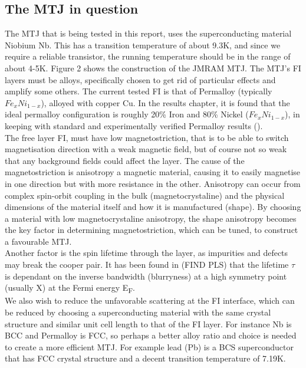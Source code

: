 \documentclass[12pt]{article}
\begin{document}
\subsection{The MTJ in question}


The MTJ that is being tested in this report, uses the superconducting material Niobium Nb. This has a transition temperature of about 9.3K, and since we require a reliable transistor, the running temperature should be in the range of about 4-5K. Figure 2 shows the construction of the JMRAM MTJ. The MTJ's FI layers must be alloys, specifically chosen to get rid of particular effects and amplify some others. The current tested FI is that of Permalloy (typically $Fe_{x}Ni_{1-x}$), alloyed with copper Cu. In the results chapter, it is found that the ideal permalloy configuration is roughly 20\% Iron and 80\% Nickel ($Fe_{x}Ni_{1-x}$), in keeping with standard and experimentally verified Permalloy results (\cite{permprob}).
\\
The free layer FI, must have low magnetostriction, that is to be able to switch magnetisation direction with a weak magnetic field, but of course not so weak that any background fields could affect the layer. The cause of the magnetostriction is anisotropy a magnetic material, causing it to easily magnetise in one direction but with more resistance in the other. Anisotropy can occur from complex spin-orbit coupling in the bulk (magnetocrystaline) and the physical dimensions of the material itself and how it is manufactured (shape). By choosing a material with low magnetocrystaline anisotropy, the shape anisotropy becomes the key factor in determining magnetostriction, which can be tuned, to construct a favourable MTJ. 
\\
Another factor is the spin lifetime through the layer, as impurities and defects may break the cooper pair. It has been found in (FIND PLS) that the lifetime $\tau$ is dependant on the inverse bandwidth (blurryness) at a high symmetry point (usually X) at the Fermi energy E\textsubscript{F}.
\\
We also wish to reduce the unfavorable scattering at the FI interface, which can be reduced by choosing a superconducting material with the same crystal structure and similar unit cell length to that of the FI layer. For instance Nb is BCC \cite{ashcroft} and Permalloy is FCC, so perhaps a better alloy ratio and choice is needed to create a more efficient MTJ. For example lead (Pb) is a BCS superconductor that has FCC crystal structure\cite{ashcroft} and a decent transition temperature of 7.19K.
\end{document}
